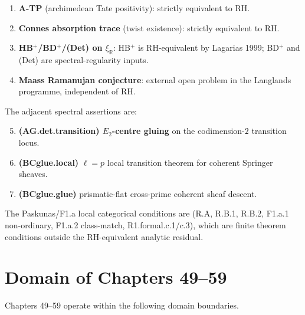 \begin{enumerate}
\item \textbf{A-TP} (archimedean Tate positivity): strictly
equivalent to RH.
\item \textbf{Connes absorption trace} (twist existence):
strictly equivalent to RH.
\item \textbf{HB\(^{+}\)/BD\(^{+}\)/(Det) on \(\xi_{\mathbb{R}}\)}:
HB\(^{+}\) is RH-equivalent by Lagarias 1999; BD\(^{+}\) and (Det)
are spectral-regularity inputs.
\item \textbf{Maass Ramanujan conjecture}: external open problem
in the Langlands programme, independent of RH.
\end{enumerate}

The adjacent spectral assertions are:

\begin{enumerate}
\setcounter{enumi}{4}
\item \textbf{(AG.det.transition) \(E_{2}\)-centre gluing} on the
codimension-\(2\) transition locus.
\item \textbf{(BCglue.local)} \(\ell=p\) local transition theorem
for coherent Springer sheaves.
\item \textbf{(BCglue.glue)} prismatic-flat cross-prime coherent
sheaf descent.
\end{enumerate}

The Paskunas/F1.a local categorical conditions are (R.A, R.B.1,
R.B.2, F1.a.1 non-ordinary, F1.a.2 class-match, R1.formal.c.1/c.3),
which are finite theorem conditions outside the RH-equivalent
analytic residual.

\section{Domain of Chapters 49--59}
\label{v4-arith:w5-synth:does-not-do}

Chapters 49--59 operate within the following domain boundaries.

